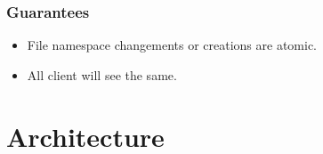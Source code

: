 \documentclass{beamer}
\begin{document}
{
\begin{frame}
 \frametitle{Guarantees}
 \begin{center}
 \begin{itemize}
  \item File namespace changements or creations are atomic. %
  \item All client will see the same. %
 \end{itemize}
 \end{center}
\end{frame}
}

\section{Architecture}
\end{document}
